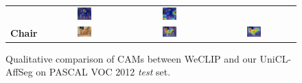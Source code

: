 \begin{figure}[H]
\begin{tcolorbox}[colframe=black!60, colback=white, boxrule=0.8pt, arc=2pt, left=2pt, right=2pt, top=2pt, bottom=2pt]
\begin{tabular}{m{2.5cm} c c c}
    & \includegraphics[width=0.18\textwidth,height=0.18\textwidth]{figures/test_cams/weclip/2007_000783_14}
    & \includegraphics[width=0.18\textwidth,height=0.18\textwidth]{figures/test_cams/ours/2007_000783_14}
    \\
    \textbf{Chair}
    & \includegraphics[width=0.18\textwidth,height=0.18\textwidth]{figures/originals/2007_005844}
    & \includegraphics[width=0.18\textwidth,height=0.18\textwidth]{figures/test_cams/weclip/2007_005844_8}
    & \includegraphics[width=0.18\textwidth,height=0.18\textwidth]{figures/test_cams/ours/2007_005844_8}
    \\
  \end{tabular}

  \end{tcolorbox}

  \caption{Qualitative comparison of CAMs between WeCLIP and our UniCL-AffSeg on PASCAL VOC 2012 \textit{test} set.}
  \label{fig:qualitative_comparison_cam_test}
\end{figure}